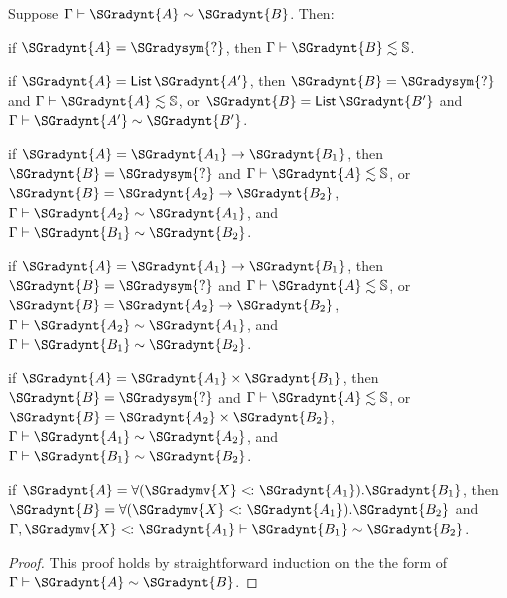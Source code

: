 \begin{lemma}
  \label{lemma:inversion_of_type_consistency}
  Suppose $ \Gamma  \vdash  \SGradynt{A}  \sim  \SGradynt{B} $. Then:
  \begin{enumR}
  \item if $\SGradynt{A} = \SGradysym{\mbox{?}}$, then $ \Gamma  \vdash  \SGradynt{B}  \lesssim   \mathbb{S}  $.
  \item if $\SGradynt{A} =  \mathsf{List}\, \SGradynt{A'} $, then $\SGradynt{B} = \SGradysym{\mbox{?}}$ and $ \Gamma  \vdash  \SGradynt{A}  \lesssim   \mathbb{S}  $, or
    $\SGradynt{B} =  \mathsf{List}\, \SGradynt{B'} $ and $ \Gamma  \vdash  \SGradynt{A'}  \sim  \SGradynt{B'} $.
  \item if $\SGradynt{A} = \SGradynt{A_{{\mathrm{1}}}}  \rightarrow  \SGradynt{B_{{\mathrm{1}}}}$, then $\SGradynt{B} = \SGradysym{\mbox{?}}$ and $ \Gamma  \vdash  \SGradynt{A}  \lesssim   \mathbb{S}  $, or
    $\SGradynt{B} = \SGradynt{A_{{\mathrm{2}}}}  \rightarrow  \SGradynt{B_{{\mathrm{2}}}}$, $ \Gamma  \vdash  \SGradynt{A_{{\mathrm{2}}}}  \sim  \SGradynt{A_{{\mathrm{1}}}} $, and $ \Gamma  \vdash  \SGradynt{B_{{\mathrm{1}}}}  \sim  \SGradynt{B_{{\mathrm{2}}}} $.
  \item if $\SGradynt{A} = \SGradynt{A_{{\mathrm{1}}}}  \rightarrow  \SGradynt{B_{{\mathrm{1}}}}$, then $\SGradynt{B} = \SGradysym{\mbox{?}}$ and $ \Gamma  \vdash  \SGradynt{A}  \lesssim   \mathbb{S}  $, or
    $\SGradynt{B} = \SGradynt{A_{{\mathrm{2}}}}  \rightarrow  \SGradynt{B_{{\mathrm{2}}}}$, $ \Gamma  \vdash  \SGradynt{A_{{\mathrm{2}}}}  \sim  \SGradynt{A_{{\mathrm{1}}}} $, and $ \Gamma  \vdash  \SGradynt{B_{{\mathrm{1}}}}  \sim  \SGradynt{B_{{\mathrm{2}}}} $.
  \item if $\SGradynt{A} =  \SGradynt{A_{{\mathrm{1}}}}  \times  \SGradynt{B_{{\mathrm{1}}}} $, then $\SGradynt{B} = \SGradysym{\mbox{?}}$ and $ \Gamma  \vdash  \SGradynt{A}  \lesssim   \mathbb{S}  $, or
    $\SGradynt{B} =  \SGradynt{A_{{\mathrm{2}}}}  \times  \SGradynt{B_{{\mathrm{2}}}} $, $ \Gamma  \vdash  \SGradynt{A_{{\mathrm{1}}}}  \sim  \SGradynt{A_{{\mathrm{2}}}} $, and $ \Gamma  \vdash  \SGradynt{B_{{\mathrm{1}}}}  \sim  \SGradynt{B_{{\mathrm{2}}}} $.
  \item if $\SGradynt{A} =  \forall ( \SGradymv{X}  <\hspace{-2px}\colon  \SGradynt{A_{{\mathrm{1}}}} ).  \SGradynt{B_{{\mathrm{1}}}} $, then $\SGradynt{B} =  \forall ( \SGradymv{X}  <\hspace{-2px}\colon  \SGradynt{A_{{\mathrm{1}}}} ).  \SGradynt{B_{{\mathrm{2}}}} $ and $  \Gamma , \SGradymv{X}  <\hspace{-2px}\colon  \SGradynt{A_{{\mathrm{1}}}}   \vdash  \SGradynt{B_{{\mathrm{1}}}}  \sim  \SGradynt{B_{{\mathrm{2}}}} $.
  \end{enumR}
\end{lemma}
\begin{proof}
  This proof holds by straightforward induction on the the form of $ \Gamma  \vdash  \SGradynt{A}  \sim  \SGradynt{B} $.
\end{proof}

